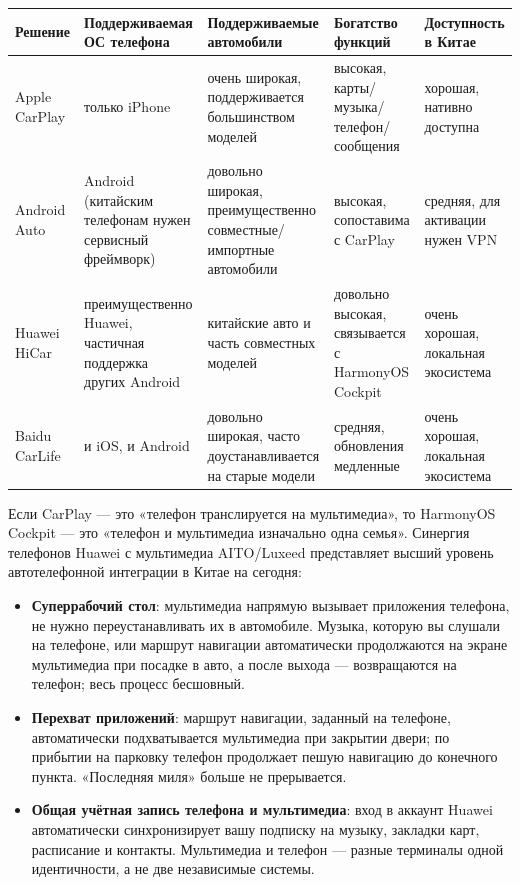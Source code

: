 \begin{center}
\begin{tabularx}{\linewidth}{|X|X|X|X|X|}
\hline
\textbf{Решение} & \textbf{Поддерживаемая ОС телефона} & \textbf{Поддерживаемые автомобили} & \textbf{Богатство функций} & \textbf{Доступность в Китае} \tabularnewline
\hline
Apple CarPlay & только iPhone & очень широкая, поддерживается большинством моделей & высокая, карты/музыка/телефон/сообщения & хорошая, нативно доступна \tabularnewline
Android Auto & Android (китайским телефонам нужен сервисный фреймворк) & довольно широкая, преимущественно совместные/импортные автомобили & высокая, сопоставима с CarPlay & средняя, для активации нужен VPN \tabularnewline
Huawei HiCar & преимущественно Huawei, частичная поддержка других Android & китайские авто и часть совместных моделей & довольно высокая, связывается с HarmonyOS Cockpit & очень хорошая, локальная экосистема \tabularnewline
Baidu CarLife & и iOS, и Android & довольно широкая, часто доустанавливается на старые модели & средняя, обновления медленные & очень хорошая, локальная экосистема \tabularnewline
\hline
\end{tabularx}
\end{center}


Если CarPlay — это «телефон транслируется на мультимедиа», то HarmonyOS Cockpit — это «телефон и мультимедиа изначально одна семья». Синергия телефонов Huawei с мультимедиа AITO/Luxeed представляет высший уровень автотелефонной интеграции в Китае на сегодня:

\begin{itemize}
  \item \textbf{Суперрабочий стол}: мультимедиа напрямую вызывает приложения телефона, не нужно переустанавливать их в автомобиле. Музыка, которую вы слушали на телефоне, или маршрут навигации автоматически продолжаются на экране мультимедиа при посадке в авто, а после выхода — возвращаются на телефон; весь процесс бесшовный.
  \item \textbf{Перехват приложений}: маршрут навигации, заданный на телефоне, автоматически подхватывается мультимедиа при закрытии двери; по прибытии на парковку телефон продолжает пешую навигацию до конечного пункта. «Последняя миля» больше не прерывается.
  \item \textbf{Общая учётная запись телефона и мультимедиа}: вход в аккаунт Huawei автоматически синхронизирует вашу подписку на музыку, закладки карт, расписание и контакты. Мультимедиа и телефон — разные терминалы одной идентичности, а не две независимые системы.
\end{itemize}

